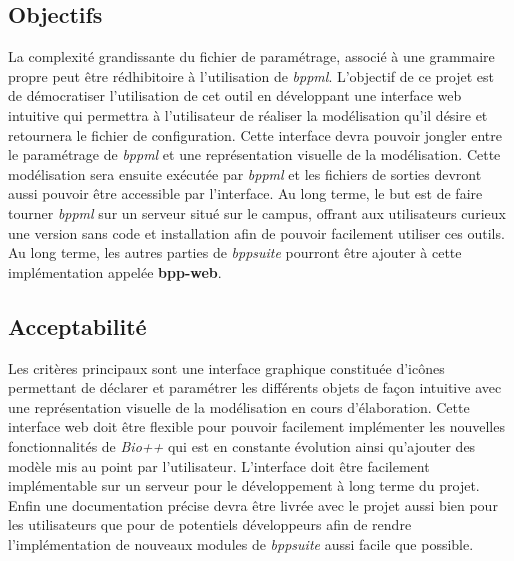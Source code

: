 	
\subsection{Objectifs}
	La complexité grandissante du fichier de paramétrage, associé à une grammaire propre peut être rédhibitoire à l'utilisation de \textit{bppml}. L'objectif de ce projet est de démocratiser l'utilisation de cet outil en développant une interface web intuitive qui permettra à l'utilisateur de réaliser la modélisation qu'il désire et retournera le fichier de configuration. Cette interface devra pouvoir jongler entre le paramétrage de \textit{bppml} et une représentation visuelle de la modélisation. Cette modélisation sera ensuite exécutée par \textit{bppml} et les fichiers de sorties devront aussi pouvoir être accessible par l'interface. Au long terme, le but est de faire tourner \textit{bppml} sur un serveur situé sur le campus, offrant aux utilisateurs curieux une version sans code et installation afin de pouvoir facilement utiliser ces outils. Au long terme, les autres parties de \textit{bppsuite} pourront être ajouter à cette implémentation appelée \textbf{bpp-web}.
	
\subsection{Acceptabilité}
	Les critères principaux sont une interface graphique constituée d'icônes permettant de déclarer et paramétrer les différents objets de façon intuitive avec une représentation visuelle de la modélisation en cours d'élaboration. Cette interface web doit être flexible pour pouvoir facilement implémenter les nouvelles fonctionnalités de \textit{Bio++} qui est en constante évolution ainsi qu'ajouter des modèle mis au point par l'utilisateur. L'interface doit être facilement implémentable sur un serveur pour le développement à long terme du projet.
Enfin une documentation précise devra être livrée avec le projet aussi bien pour les utilisateurs que pour de potentiels développeurs
 afin de rendre l'implémentation de nouveaux modules de \textit{bppsuite} aussi facile que possible.
	

